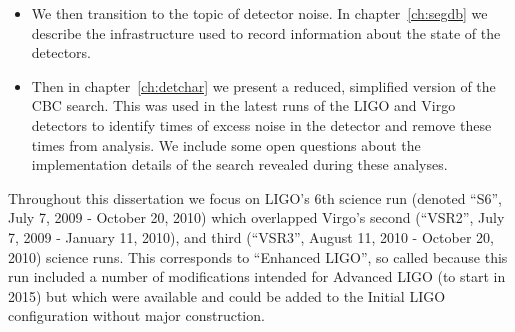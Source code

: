 \begin{itemize}
\item We then transition to the topic of detector noise.  In
chapter~\ref{ch:segdb} we describe the infrastructure used to record 
information about the state of the detectors.

\item Then in chapter~\ref{ch:detchar} we present a reduced,
simplified version of the CBC search.  This was used in the latest
runs of the LIGO and Virgo detectors to identify times of excess noise
in the detector and remove these times from analysis.  We include some
open questions about the implementation details of the search revealed
during these analyses.

\end{itemize}

Throughout this dissertation we focus on LIGO's 6th science run
(denoted ``S6'', July 7, 2009 - October 20, 2010) which overlapped
Virgo's second (``VSR2'', July 7, 2009 - January 11, 2010), and third
(``VSR3'', August 11, 2010 - October 20, 2010) science runs.  This
corresponds to ``Enhanced LIGO'', so called because this run included
a number of modifications intended for Advanced LIGO (to start in
2015) but which were available and could be added to the Initial LIGO
configuration without major construction.

